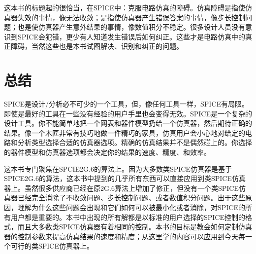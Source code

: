 这本书的标题起的很恰当，在SPICE中：克服电路仿真的障碍。仿真障碍是指使仿真器失效的事情，像无法收敛；是指使仿真器产生错误答案的事情，像步长控制问题；也是使仿真器产生意外结果的事情，像数值积分不稳定。很多设计人员没有意识到SPICE会犯错，更少有人知道发生错误后如何纠正。这些才是电路仿真中的真正障碍，当然这些也是本书试图解决、识别和纠正的问题。

\section{总结}
SPICE是设计/分析必不可少的一个工具，但，像任何工具一样，SPICE有局限。即使是最好的工具在一些没有经验的用户手里也会变得无效。SPICE是一个复杂的设计工具。你不能简单地把一个网表和器件模型扔给一个仿真器，然后期待正确的结果。像一个木匠非常有技巧地做一件精巧的家具，仿真用户会小心地对给定的电路和分析类型选择合适的仿真器选项。精确的仿真结果并不是偶然碰上的。你选择的器件模型和仿真器选项都会决定你的结果的速度、精度、和效率。

这本书专门聚焦在SPCIE2G.6的算法上。因为大多数类SPICE仿真器是基于SPICE2G.6的算法，这本书中提到的几乎所有东西可以直接应用到类SPICE仿真器上。虽然很多供应商已经在原2G.6算法上增加了修正，但没有一个类SPICE仿真器已经完全消除了不收敛问题、步长控制问题、或者数值积分问题。出于这些原因，理解为什么这些问题会出现和它们如何可以被最小化或者消除，对SPICE的所有用户都是重要的。本书中出现的所有解都是以标准的用户选择的SPICE控制的格式，而且大多数类SPICE仿真器有着相同的控制。本书的目标是教会如何定制仿真器的控制参数来提高仿真结果的速度和精度；从这里学的内容可以应用到今天每一个可行的类SPICE仿真器上。


